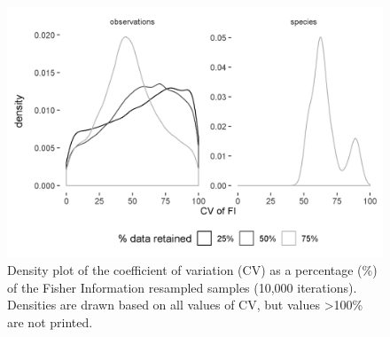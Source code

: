 \documentclass[print]{nuthesis}
\begin{document}
\begin{figure}
\includegraphics[width=0.85\linewidth]{./chapterFiles/resampling/figsCalledInDiss/FI_cvDensity} \caption{Density plot of the coefficient of variation (CV) as a percentage (\%) of the Fisher Information resampled samples (10,000 iterations). Densities are drawn based on all values of CV, but values \textgreater100\% are not printed.}\label{fig:fiCV}
\end{figure}
\end{document}
